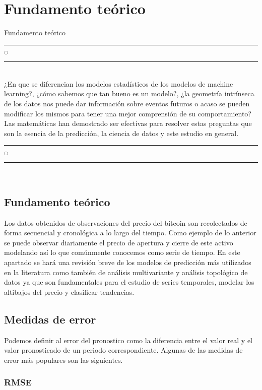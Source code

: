 \chapter[Fundamento teórico]{Fundamento teórico}{Fundamento teórico}\label{Fundamento}

\noindent
\rule{0.49\textwidth}{0.75pt} $_{\bigcirc}$ \rule{0.49\textwidth}{0.75pt}\\

¿En que se diferencian los modelos estadísticos de los modelos de machine learning?, ¿cómo sabemos que tan bueno es un modelo?, ¿la geometría intrínseca de los datos nos puede dar información sobre eventos futuros o acaso se pueden modificar los mismos para tener una mejor comprensión de su comportamiento? Las matemáticas han demostrado ser efectivas para resolver estas preguntas que son la esencia de la predicción, la ciencia de datos y este estudio en general.
\\

\noindent
\rule{0.49\textwidth}{0.75pt} $_{\bigcirc}$ \rule{0.49\textwidth}{0.75pt}\\
\clearpage

\section{Fundamento teórico}

Los datos obtenidos de observaciones del precio del bitcoin son recolectados de forma secuencial y cronológica a lo largo del tiempo. Como ejemplo de lo anterior se puede observar diariamente el precio de apertura y cierre de este activo modelando así lo que comúnmente conocemos como serie de tiempo. En este apartado se hará una revisión breve de los modelos de predicción más utilizados en la literatura como también de análisis multivariante y análisis topológico de datos ya que son fundamentales para el estudio de series temporales, modelar los altibajos del precio y clasificar tendencias.

\section{Medidas de error}
Podemos definir al error del pronostico como la diferencia entre el valor real y el valor pronosticado de un periodo correspondiente. Algunas de las medidas de error más populares son las siguientes.

\subsection{RMSE}

